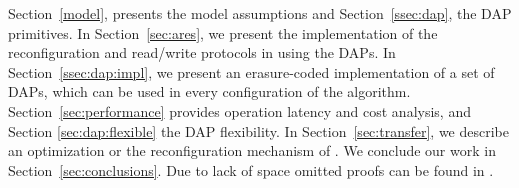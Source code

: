 Section~\ref{model}, presents the model assumptions 
and Section~\ref{ssec:dap}, the DAP  primitives.  
 In Section~\ref{sec:ares}, we present the implementation of the reconfiguration and read/write 
 protocols in \ares{} using the DAPs.
 In Section~\ref{ssec:dap:impl}, we present an erasure-coded implementation of a set of  DAPs, which 
 can be used in every configuration of 
 the \ares{} algorithm.
 Section~\ref{sec:performance} provides operation latency and cost analysis, and Section 
 \ref{sec:dap:flexible} the DAP flexibility. 
In Section~\ref{sec:transfer}, we describe an optimization or the reconfiguration mechanism of \ares{}.
 We conclude our work in Section~\ref{sec:conclusions}.
  Due to lack of space omitted proofs can be found in 
  \cite{ARES:Arxiv:2018}.


